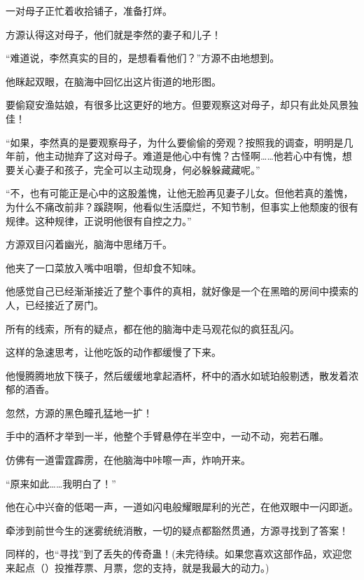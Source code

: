 \begin{this_body}
一对母子正忙着收拾铺子，准备打烊。

方源认得这对母子，他们就是李然的妻子和儿子！

“难道说，李然真实的目的，是想看看他们？”方源不由地想到。

他眯起双眼，在脑海中回忆出这片街道的地形图。

要偷窥安渔姑娘，有很多比这更好的地方。但要观察这对母子，却只有此处风景独佳！

“如果，李然真的是要观察母子，为什么要偷偷的旁观？按照我的调查，明明是几年前，他主动抛弃了这对母子。难道是他心中有愧？古怪啊……他若心中有愧，想要关心妻子和孩子，完全可以主动现身，何必躲躲藏藏呢。”

“不，也有可能正是心中的这股羞愧，让他无脸再见妻子儿女。但他若真的羞愧，为什么不痛改前非？蹊跷啊，他看似生活糜烂，不知节制，但事实上他颓废的很有规律。这种规律，正说明他很有自控之力。”

方源双目闪着幽光，脑海中思绪万千。

他夹了一口菜放入嘴中咀嚼，但却食不知味。

他感觉自己已经渐渐接近了整个事件的真相，就好像是一个在黑暗的房间中摸索的人，已经接近了房门。

所有的线索，所有的疑点，都在他的脑海中走马观花似的疯狂乱闪。

这样的急速思考，让他吃饭的动作都缓慢了下来。

他慢腾腾地放下筷子，然后缓缓地拿起酒杯，杯中的酒水如琥珀般剔透，散发着浓郁的酒香。

忽然，方源的黑色瞳孔猛地一扩！

手中的酒杯才举到一半，他整个手臂悬停在半空中，一动不动，宛若石雕。

仿佛有一道雷霆霹雳，在他脑海中咔嚓一声，炸响开来。

“原来如此……我明白了！”

他在心中兴奋的低喝一声，一道如闪电般耀眼犀利的光芒，在他双眼中一闪即逝。

牵涉到前世今生的迷雾统统消散，一切的疑点都豁然贯通，方源寻找到了答案！

同样的，也“寻找”到了丢失的传奇蛊！(未完待续。如果您喜欢这部作品，欢迎您来起点（）投推荐票、月票，您的支持，就是我最大的动力。)

\end{this_body}

